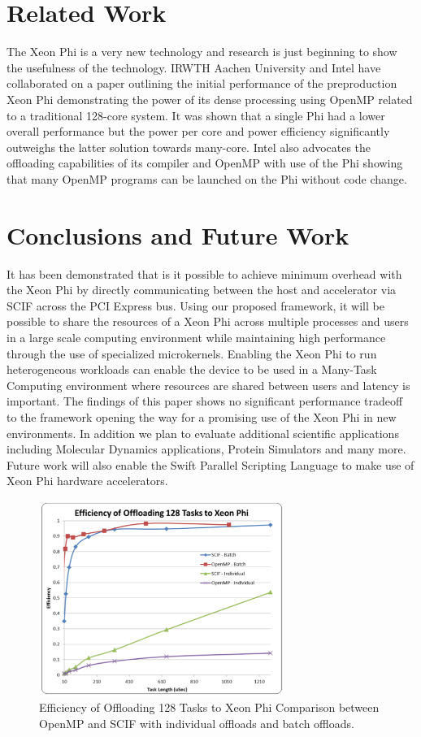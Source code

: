 \documentclass[conference]{IEEEtran}
\begin{document}
\section{Related Work}
The Xeon Phi is a very new technology and research is just beginning to show the usefulness of the technology. IRWTH Aachen University and Intel have collaborated on a paper outlining the initial performance of the preproduction Xeon Phi demonstrating the power of its dense processing using OpenMP related to a traditional 128-core system. It was shown that a single Phi had a lower overall performance but the power per core and power efficiency significantly outweighs the latter solution towards many-core. Intel also advocates the offloading capabilities of its compiler and OpenMP with use of the Phi showing that many OpenMP programs can be launched on the Phi without code change.

\section{Conclusions and Future Work}
It has been demonstrated that is it possible to achieve minimum overhead with the Xeon Phi by directly communicating between the host and accelerator via SCIF across the PCI Express bus. Using our proposed framework, it will be possible to share the resources of a Xeon Phi across multiple processes and users in a large scale computing environment while maintaining high performance through the use of specialized microkernels. Enabling the Xeon Phi to run heterogeneous workloads can enable the device to be used in a Many-Task Computing \cite{raicu2008toward} environment where resources are shared between users and latency is important. The findings of this paper shows no significant performance tradeoff to the framework opening the way for a promising use of the Xeon Phi in new environments. In addition we plan to evaluate additional scientific applications including Molecular Dynamics applications, Protein Simulators \cite{OOPS} and many more. Future work will also enable the Swift Parallel Scripting Language to make use of Xeon Phi hardware accelerators. \cite{zhao2007swift}

\begin{figure}[h]
\centering\includegraphics[width=8cm]{imgs/sleep_phi.png}
\caption{Efficiency of Offloading 128 Tasks to Xeon Phi Comparison between OpenMP and SCIF with individual offloads and batch offloads.}
\label{fig:sleep_phi}
\end{figure}



\end{document}
